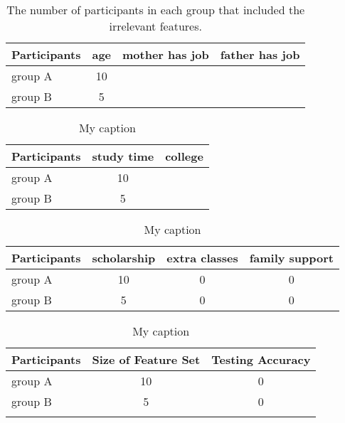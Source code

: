 \begin{table}[]
\centering
\begin{tabular}{lccc}
\hline
Participants & \multicolumn{1}{l}{age} & \multicolumn{1}{l}{mother has job} & \multicolumn{1}{l}{father has job} \\ \hline
group A      & 10                      &                                    &                                    \\
group B      & 5                       &                                    &
\end{tabular}
\caption{The number of participants in each group that included the irrelevant features.}
\label{IrrelevantFeatures}
\end{table}

\begin{table}[]
\centering
\begin{tabular}{lcc}
\hline
Participants & \multicolumn{1}{l}{study time} & \multicolumn{1}{l}{college} \\ \hline
group A      & 10                             &                             \\
group B      & 5                              &
\end{tabular}
\caption{My caption}
\label{RelevantFSBasedOnImportance}
\end{table}

\begin{table}[]
\centering
\begin{tabular}{lccc}
\hline
Participants & \multicolumn{1}{l}{scholarship} & \multicolumn{1}{l}{extra classes} & \multicolumn{1}{l}{family support} \\ \hline
group A      & 10                              & 0                                 & 0                                  \\
group B      & 5                               & 0                                 & 0
\end{tabular}
\caption{My caption}
\label{RevelantFSBasedOnCausal}
\end{table}

\begin{table}[]
\centering
\begin{tabular}{lcc}
\hline
Participants & \multicolumn{1}{l}{Size of Feature Set} & \multicolumn{1}{l}{Testing Accuracy} \\ \hline
group A      & 10                                      & 0                                    \\
group B      & 5                                       & 0                                    \\
             &                                         &
\end{tabular}
\caption{My caption}
\label{AccuracyComparison}
\end{table}

